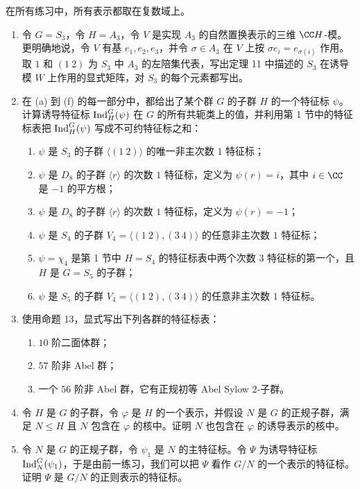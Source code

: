 在所有练习中，所有表示都取在复数域上。
\begin{enumerate}[label=\arabic*.]
  \item 令 $G=S_3$，令 $H=A_3$，令 $V$ 是实现 $A_3$ 的自然置换表示的三维 $\CC H$-模。更明确地说，令 $V$ 有基 $e_1,e_2,e_3$，并令 $\sigma\in A_3$ 在 $V$ 上按 $\sigma e_i=e_{\sigma(i)}$ 作用。取 $1$ 和 $(1\ 2)$ 为 $S_3$ 中 $A_3$ 的左陪集代表，写出定理 11 中描述的 $S_3$ 在诱导模 $W$ 上作用的显式矩阵，对 $S_3$ 的每个元素都写出。
  \item 在 (a) 到 (f) 的每一部分中，都给出了某个群 $G$ 的子群 $H$ 的一个特征标 $\psi$。计算诱导特征标 $\operatorname{Ind}_H^G(\psi)$ 在 $G$ 的所有共轭类上的值，并利用第 1 节中的特征标表把 $\operatorname{Ind}_H^G(\psi)$ 写成不可约特征标之和：
  \begin{enumerate}[label=(\alph*)]
    \item $\psi$ 是 $S_3$ 的子群 $\langle(1\ 2)\rangle$ 的唯一非主次数 $1$ 特征标；
    \item $\psi$ 是 $D_8$ 的子群 $\langle r\rangle$ 的次数 $1$ 特征标，定义为 $\psi(r)=i$，其中 $i\in\CC$ 是 $-1$ 的平方根；
    \item $\psi$ 是 $D_8$ 的子群 $\langle r\rangle$ 的次数 $1$ 特征标，定义为 $\psi(r)=-1$；
    \item $\psi$ 是 $S_4$ 的子群 $V_4=\langle(1\ 2),(3\ 4)\rangle$ 的任意非主次数 $1$ 特征标；
    \item $\psi=\chi_4$ 是第 1 节中 $H=S_4$ 的特征标表中两个次数 $3$ 特征标的第一个，且 $H$ 是 $G=S_5$ 的子群；
    \item $\psi$ 是 $S_5$ 的子群 $V_4=\langle(1\ 2),(3\ 4)\rangle$ 的任意非主次数 $1$ 特征标。
  \end{enumerate}
  \item 使用命题 13，显式写出下列各群的特征标表：
  \begin{enumerate}[label=(\alph*)]
    \item $10$ 阶二面体群；
    \item $57$ 阶非 Abel 群；
    \item 一个 $56$ 阶非 Abel 群，它有正规初等 Abel Sylow $2$-子群。
  \end{enumerate}
  \item 令 $H$ 是 $G$ 的子群，令 $\varphi$ 是 $H$ 的一个表示，并假设 $N$ 是 $G$ 的正规子群，满足 $N\leq H$ 且 $N$ 包含在 $\varphi$ 的核中。证明 $N$ 也包含在 $\varphi$ 的诱导表示的核中。
  \item 令 $N$ 是 $G$ 的正规子群，令 $\psi_1$ 是 $N$ 的主特征标。令 $\Psi$ 为诱导特征标 $\operatorname{Ind}_N^G(\psi_1)$，于是由前一练习，我们可以把 $\Psi$ 看作 $G/N$ 的一个表示的特征标。证明 $\Psi$ 是 $G/N$ 的正则表示的特征标。

\end{enumerate}
